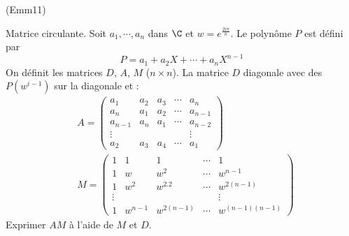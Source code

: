 \begin{tiny}(Emm11)\end{tiny} Matrice circulante.
Soit $a_1,\cdots,a_n$ dans $\C$ et $w=e^{\frac{2i\pi}{n}}$. Le polynôme $P$ est défini par
\begin{displaymath}
 P = a_1+a_2X+\cdots +a_nX^{n-1}
\end{displaymath}
On définit les matrices $D$, $A$, $M$ ($n\times n$). La matrice $D$ diagonale avec des $P(w^{i-1})$ sur la diagonale et :
\begin{align*}
 &A=
\begin{pmatrix}
 a_1 & a_2 & a_3 & \cdots & a_n \\
 a_n & a_1 & a_2 & \cdots & a_{n-1} \\
 a_{n-1} & a_n & a_1 & \cdots & a_{n-2} \\
\vdots & & & & \vdots \\
a_2 & a_3 & a_4 & \cdots & a_1
\end{pmatrix} \\
&M=
\begin{pmatrix}
 1 & 1 & 1 &\cdots & 1\\
 1 & w & w^{2} & \cdots & w^{n-1}\\
 1 & w^2 & w^{2.2} & \cdots & w^{2(n-1)}\\
 \vdots & & & & \vdots \\
 1 & w^{n-1} & w^{2(n-1)} & \cdots & w^{(n-1)(n-1)}
\end{pmatrix}
\end{align*}
Exprimer $AM$ à l'aide de $M$ et $D$. 